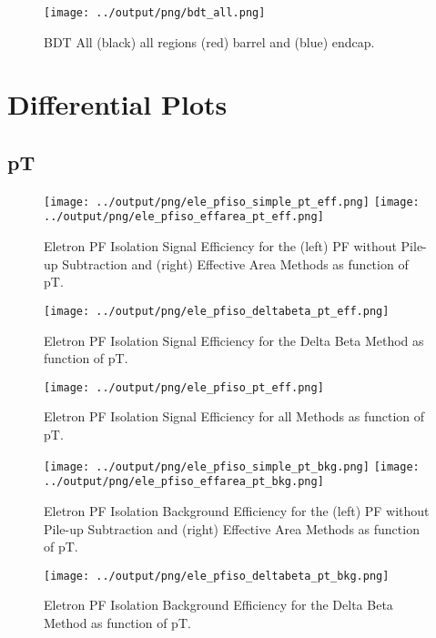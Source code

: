 \documentclass[11pt]{book}
\begin{document}
\begin{figure}[htb]
\centering
\texttt{[image: ../output/png/bdt\_all.png]}
\caption{BDT All (black) all regions (red) barrel and (blue) endcap.}
\label{fig:bdt_all}
\end{figure}


\clearpage

\chapter{Differential Plots}
\section{pT}

\begin{figure}[htb]
\centering
\texttt{[image: ../output/png/ele\_pfiso\_simple\_pt\_eff.png]}
\texttt{[image: ../output/png/ele\_pfiso\_effarea\_pt\_eff.png]}
\caption{Eletron PF Isolation Signal Efficiency for the (left) PF without Pile-up Subtraction and (right) Effective Area Methods as function of pT.}
\label{fig:ele_pfiso_pt_eff_simple_effarea}
\end{figure}

\begin{figure}[htb]
\centering
\texttt{[image: ../output/png/ele\_pfiso\_deltabeta\_pt\_eff.png]}
\caption{Eletron PF Isolation Signal Efficiency for the Delta Beta Method as function of pT.}
\label{fig:ele_pfiso_pt_eff_deltabeta}
\end{figure}

\begin{figure}[htb]
\centering
\texttt{[image: ../output/png/ele\_pfiso\_pt\_eff.png]}
\caption{Eletron PF Isolation Signal Efficiency for all Methods as function of pT.}
\label{fig:ele_pfiso_pt_eff}
\end{figure}


\begin{figure}[htb]
\centering
\texttt{[image: ../output/png/ele\_pfiso\_simple\_pt\_bkg.png]}
\texttt{[image: ../output/png/ele\_pfiso\_effarea\_pt\_bkg.png]}
\caption{Eletron PF Isolation Background Efficiency for the (left) PF without Pile-up Subtraction and (right) Effective Area Methods as function of pT.}
\label{fig:ele_pfiso_pt_bkg_simple_effarea}
\end{figure}

\begin{figure}[htb]
\centering
\texttt{[image: ../output/png/ele\_pfiso\_deltabeta\_pt\_bkg.png]}
\caption{Eletron PF Isolation Background Efficiency for the Delta Beta Method as function of pT.}
\label{fig:ele_pfiso_pt_bkg_deltabeta}
\end{figure}
\end{document}
